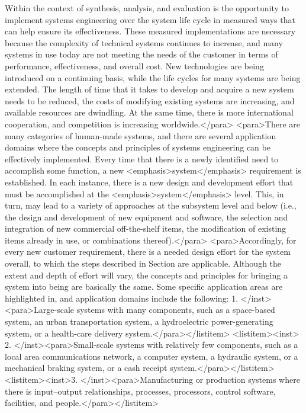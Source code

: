 Within the context of synthesis, analysis, and evaluation is the opportunity to implement systems engineering over the system life cycle in measured ways that can help ensure its effectiveness. These measured implementations are necessary because the complexity of technical systems continues to increase, and many systems in use today are not meeting the needs of the customer in terms of performance, effectiveness, and overall cost. New technologies are being introduced on a continuing basis, while the life cycles for many systems are being extended. The length of time that it takes to develop and acquire a new system needs to be reduced, the costs of modifying existing systems are increasing, and available resources are dwindling. At the same time, there is more international cooperation, and competition is increasing worldwide.</para>
	<para>There are many categories of human-made systems, and there are several application domains where the concepts and principles of systems engineering can be effectively implemented. Every time that there is a newly identified need to accomplish some function, a new <emphasis>system</emphasis> requirement is established. In each instance, there is a new design and development effort that must be accomplished at the <emphasis>system</emphasis> level. This, in turn, may lead to a variety of approaches at the subsystem level and below (i.e., the design and development of new equipment and software, the selection and integration of new commercial off-the-shelf items, the modification of existing items already in use, or combinations thereof).</para>
<para>Accordingly, for every new customer requirement, there is a needed design effort for the system overall, to which the steps described in Section are applicable. Although the extent and depth of effort will vary, the concepts and principles for bringing a system into being are basically the same. Some specific application areas are highlighted in, and application domains include the following:
1.	</inst><para>Large-scale systems with many components, such as a space-based system, an urban transportation system, a hydroelectric power-generating system, or a health-care delivery system.</para></listitem>
<listitem><inst>	2.	</inst><para>Small-scale systems with relatively few components, such as a local area communications network, a computer system, a hydraulic system, or a mechanical braking system, or a cash receipt system.</para></listitem>
<listitem><inst>3. 	</inst><para>Manufacturing or production systems where there is input–output relationships, processes, processors, control software, facilities, and people.</para></listitem>
